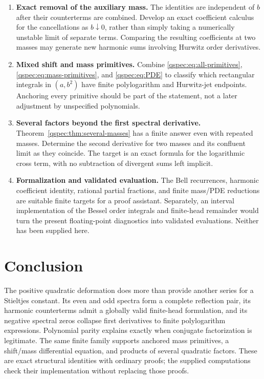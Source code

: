 \documentclass[11pt,letterpaper]{article}
\numberwithin{equation}{section}
\theoremstyle{definition}
\begin{document}
\begin{enumerate}
\item \textbf{Exact removal of the auxiliary mass.}
The identities are independent of $b$ after their counterterms are
combined. Develop an exact coefficient calculus for the cancellations
as $b\downarrow0$, rather than simply taking a numerically unstable
limit of separate terms. Comparing the resulting coefficients at two
masses may generate new harmonic sums involving Hurwitz order derivatives.

\item \textbf{Mixed shift and mass primitives.}
Combine \eqref{qspec:eq:all-primitives},
\eqref{qspec:eq:mass-primitives}, and \eqref{qspec:eq:PDE} to classify
which rectangular integrals in $(a,b^2)$ have finite polylogarithm and
Hurwitz-jet endpoints. Anchoring every primitive should be part of the
statement, not a later adjustment by unspecified polynomials.

\item \textbf{Several factors beyond the first spectral derivative.}
Theorem~\ref{qspec:thm:several-masses} has a finite answer even with
repeated masses. Determine the second derivative for two masses and
its confluent limit as they coincide. The target is an exact formula
for the logarithmic cross term, with no subtraction of divergent sums
left implicit.

\item \textbf{Formalization and validated evaluation.}
The Bell recurrences, harmonic coefficient identity, rational partial
fractions, and finite mass/PDE reductions are suitable finite targets
for a proof assistant. Separately, an interval implementation of the
Bessel order integrals and finite-head remainder would turn the present
floating-point diagnostics into validated evaluations. Neither has
been supplied here.
\end{enumerate}

\section*{Conclusion}
The positive quadratic deformation does more than provide another series
for a Stieltjes constant. Its even and odd spectra form a complete
reflection pair, its harmonic counterterms admit a globally valid
finite-head formulation, and its negative spectral zeros collapse first
derivatives to finite polylogarithm expressions. Polynomial parity
explains exactly when conjugate factorization is legitimate. The same
finite family supports anchored mass primitives, a shift/mass differential
equation, and products of several quadratic factors. These are exact
structural identities with ordinary proofs; the supplied computations
check their implementation without replacing those proofs.
\end{document}
